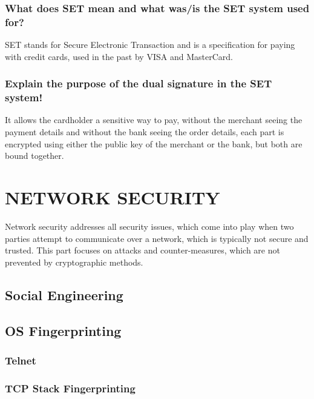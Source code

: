 \documentclass[a4paper, 10 pt, conference]{ieeeconf}
\begin{document}
\subsubsection{\textbf{What does SET mean and what was/is the SET system used for?}}
SET stands for Secure Electronic Transaction and is a specification for paying with credit cards, used in the past by VISA and MasterCard.
\subsubsection{\textbf{Explain the purpose of the dual signature in the SET system!}}
It allows the cardholder a sensitive way to pay, without the merchant seeing the payment details and without the bank seeing the order details, each part is encrypted using either the public key of the merchant or the bank, but both are bound together. 


\pagebreak







\section{\textbf{NETWORK SECURITY}}

Network security addresses all security issues, which come into play when two parties attempt to communicate over a network, which is typically not secure and trusted. This part focuses on attacks and counter-measures, which are not prevented by cryptographic methods. 

\subsection{\textbf{Social Engineering}}

\subsection{\textbf{OS Fingerprinting}}

\subsubsection{\textbf{Telnet}}

\subsubsection{\textbf{TCP Stack Fingerprinting}}
\end{document}
